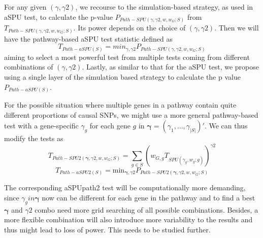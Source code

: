 \documentclass[12pt]{article}
\begin{document}
For any given $(\gamma, \gamma2)$, we recourse to the simulation-based strategy\cite{Lin2005,Seaman2005}, as used in aSPU test, to calculate the p-value $P _ { Path-SPU(\gamma, \gamma2,w,w_G ; S) }$ from $T _ { Path-SPU(\gamma, \gamma2, w,w_G; S) }$. Its power depends on the choice of $(\gamma, \gamma2)$. Then we will have the {pathway-based aSPU} test statistic defined as
\begin{equation}
T _ { Path-aSPU(S) } = min_{\gamma, \gamma2} P _ { Path-SPU(\gamma, \gamma2, w, w_G ; S) }
\end{equation}
aiming to select a most powerful test from multiple tests coming from different combinations of $(\gamma, \gamma2)$. Lastly, as similar to that for the aSPU test, we propose using a single layer of the simulation based strategy to calculate the p value $P _ { Path-aSPU(S) }$.

For the possible situation where multiple genes in a pathway contain quite different proportions of causal SNPs, we might use a more general pathway-based test with a gene-specific $\gamma_g$ for each gene $g$ in $\bm{\gamma} = (\gamma_1, \ldots, \gamma_{|S|})' $. We can thus modify the tests as
\begin{equation}
T _ { Path-SPU2(\bm{\gamma}, \gamma2, w, w_G; S) } = \sum_{g \in S} ( w_{G,g} T_ { SPU(\gamma_g, w_g ; g) } ) ^ {\gamma2}
\end{equation}  
\begin{equation}
T _ { Path-aSPU2(S) } = \mathrm{min}_{\bm{\gamma}, \gamma2} P _ { Path-SPU2(\bm{\gamma}, \gamma2, w, w_G ; S) }
\end{equation} 

The corresponding aSPUpath2 test will be computationally more demanding, since $\gamma_g in \bm{\gamma}$ now can be different for each gene in the pathway and to find a best $\bm{\gamma}$ and $\gamma2$ combo need more grid searching of all possible combinations. Besides, a more flexible combination will also introduce more variability to the results and thus might lead to loss of power. This needs to be studied further.
\end{document}

